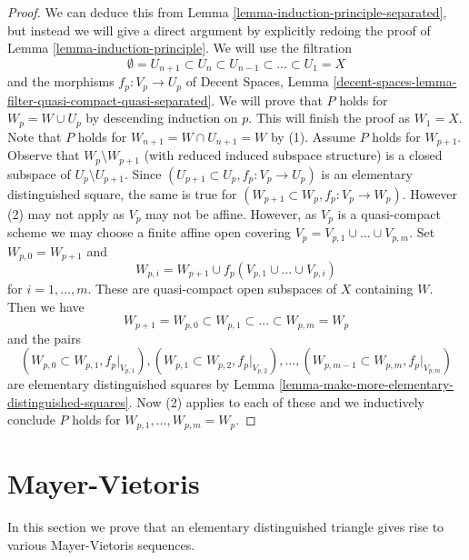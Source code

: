 \begin{proof}
We can deduce this from Lemma \ref{lemma-induction-principle-separated},
but instead we will give a direct argument by explicitly redoing the proof of
Lemma \ref{lemma-induction-principle}. We will use the filtration
$$
\emptyset = U_{n + 1} \subset
U_n \subset U_{n - 1} \subset \ldots \subset U_1 = X
$$
and the morphisms $f_p : V_p \to U_p$ of
Decent Spaces, Lemma
\ref{decent-spaces-lemma-filter-quasi-compact-quasi-separated}.
We will prove that $P$ holds for $W_p = W \cup U_p$ by descending
induction on $p$. This will finish the proof as $W_1 = X$.
Note that $P$ holds for $W_{n + 1} = W \cap U_{n + 1} = W$
by (1). Assume $P$ holds for $W_{p + 1}$. Observe that
$W_p \setminus W_{p + 1}$ (with reduced induced subspace structure)
is a closed subspace of $U_p \setminus U_{p + 1}$.
Since $(U_{p + 1} \subset U_p, f_p : V_p \to U_p)$ is an elementary
distinguished square, the same is true for
$(W_{p + 1} \subset W_p, f_p : V_p \to W_p)$.
However (2) may not apply as $V_p$ may not be affine.
However, as $V_p$ is a quasi-compact scheme we may choose
a finite affine open covering $V_p = V_{p, 1} \cup \ldots \cup V_{p, m}$.
Set $W_{p, 0} = W_{p + 1}$ and
$$
W_{p, i} = W_{p + 1} \cup f_p(V_{p, 1} \cup \ldots \cup V_{p, i})
$$
for $i = 1, \ldots, m$. These are quasi-compact open subspaces of $X$
containing $W$. Then we have
$$
W_{p + 1} = W_{p, 0} \subset
W_{p, 1} \subset \ldots \subset
W_{p, m} = W_p
$$
and the pairs
$$
(W_{p, 0} \subset W_{p, 1}, f_p|_{V_{p, 1}}),
(W_{p, 1} \subset W_{p, 2}, f_p|_{V_{p, 2}}),\ldots,
(W_{p, m - 1} \subset W_{p, m}, f_p|_{V_{p, m}})
$$
are elementary distinguished squares by
Lemma \ref{lemma-make-more-elementary-distinguished-squares}.
Now (2) applies to each of these and we inductively
conclude $P$ holds for $W_{p, 1}, \ldots, W_{p, m} = W_p$.
\end{proof}



\section{Mayer-Vietoris}
\label{section-mayer-vietoris}

\noindent
In this section we prove that an elementary distinguished triangle
gives rise to various Mayer-Vietoris sequences.

